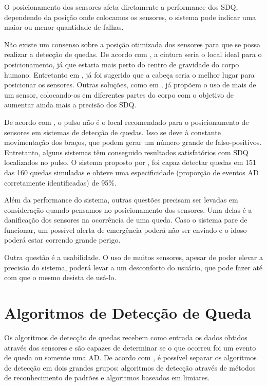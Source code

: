 O posicionamento dos sensores afeta diretamente a performance dos \ac{SDQ}, dependendo da posição onde colocamos os sensores, o sistema pode indicar uma maior ou menor quantidade de falhas. 

Não existe um consenso sobre a posição otimizada dos sensores para que se possa realizar a detecção de quedas. De acordo com \cite{abbate2011recognition}, a cintura seria o local ideal para o posicionamento, já que estaria mais perto do centro de gravidade do corpo humano. Entretanto em \cite{kangas2007determination}, já foi sugerido que a cabeça seria o melhor lugar para posicionar os sensores. Outras soluções, como em \cite{gjoreski2011accelerometer}, já propõem o uso de mais de um sensor, colocando-os em diferentes partes do corpo com o objetivo de aumentar ainda mais a precisão dos \ac{SDQ}.


De acordo com \cite{casilari2015analysis}, o pulso não é o local recomendado para o posicionamento de sensores em sistemas de detecção de quedas. Isso se deve à constante movimentação dos braços, que podem gerar um número grande de falso-positivos. Entretanto, alguns sistemas têm conseguido resultados satisfatórios com \ac{SDQ} localizados no pulso. O sistema proposto por \cite{hsieh2014wrist}, foi capaz detectar quedas em 151 das 160 quedas simuladas e obteve uma especificidade (proporção de eventos \ac{AD} corretamente identificadas) de 95\%.

Além da performance do sistema, outras questões precisam ser levadas em consideração quando pensamos no posicionamento dos sensores. Uma delas é a danificação dos sensores na ocorrência de uma queda. Caso o sistema pare de funcionar, um possível alerta de emergência poderá não ser enviado e o idoso poderá estar correndo grande perigo. 

Outra questão é a usabilidade. O uso de muitos sensores, apesar de poder elevar a precisão do sistema, poderá levar a um desconforto do usuário, que pode fazer até com que o mesmo desista de usá-lo. 


\section{Algoritmos de Detecção de Queda}
\label{sec: FDS_algorithm}
Os algoritmos de detecção de quedas recebem como entrada os dados obtidos através dos sensores e são capazes de determinar se o que ocorreu foi um evento de queda ou somente uma \ac{AD}. De acordo com \cite{casilari2015analysis}, é possível separar os algoritmos de detecção em dois grandes grupos: algoritmos de detecção através de métodos de reconhecimento de padrões e algoritmos baseados em limiares. 


